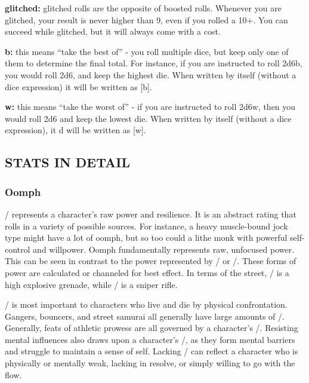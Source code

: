 \documentclass[oneside,10pt]{article}
\begin{document}
\begin{multicols}{2}
\begin{dent}
\textbf{glitched:} glitched rolls are the opposite of boosted rolls.
Whenever you are glitched, your result is never higher
than 9, even if you rolled a 10+. You can succeed while
glitched, but it will always come with a cost.

\textbf{b:} this means ``take the best of'' - you roll multiple dice,
but keep only one of them to determine the final total.
For instance, if you are instructed to roll 2d6b, you would
roll 2d6, and keep the highest die. When written by itself
(without a dice expression) it will be written as
[b].

\textbf{w:} this means ``take the worst of'' - if you are instructed to
roll 2d6w, then you would roll 2d6 and keep the lowest
die. When written by itself (without a dice expression), it d
will be written as [w].

\end{dent}

\subsection{STATS IN DETAIL}
\label{detailstats}

\subsubsection{Oomph}
\label{stat_oomph}

\oomph/ represents a character's raw power and resilience. It is an abstract rating
that rolls in a variety of possible sources. For instance, a heavy
muscle-bound jock type might have a lot of oomph, but so too could a
lithe monk with powerful self-control and willpower. Oomph
fundamentally represents raw, unfocused power. This can be seen in
contrast to the power represented by \mastery/ or \flair/. These forms
of power are calculated or channeled for best effect. In terms of the
street, \oomph/ is a high explosive grenade, while \mastery/ is a sniper
rifle.

\oomph/ is most important to characters who live and die by physical
confrontation. Gangers, bouncers, and street samurai all generally have
large amounts of \oomph/. Generally, feats of athletic prowess are
all governed by a character's \oomph/. Resisting mental influences also
draws upon a character's \oomph/, as they form mental barriers and
struggle to maintain a sense of self. Lacking \oomph/ can reflect a
character who is physically or mentally weak, lacking in resolve, or
simply willing to go with the flow.


\end{multicols}
\end{document}
